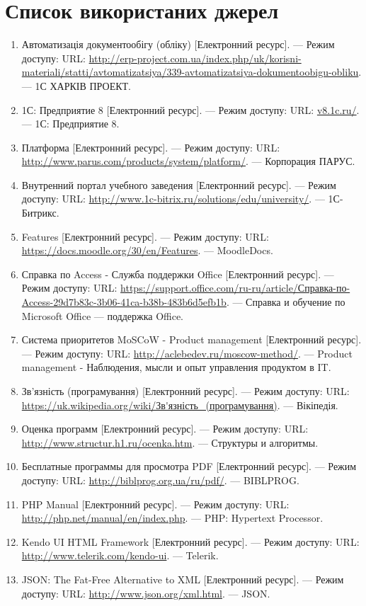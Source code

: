 \def\biblitem#1#2#3{\item \sloppypar#1 [Електронний ресурс]. --- Режим доступу: URL: \url{#2}. --- #3.}
\newpage
\section*{Список використаних джерел}
\bigskip
\begin{enumerate}
\biblitem{Автоматизація документообігу (обліку)}{http://erp-project.com.ua/index.php/uk/korisni-materiali/statti/avtomatizatsiya/339-avtomatizatsiya-dokumentoobigu-obliku}{1С ХАРКІВ ПРОЕКТ}
\biblitem{1С: Предприятие 8}{v8.1c.ru/}{1С: Предприятие 8}
\biblitem{Платформа}{http://www.parus.com/products/system/platform/}{Корпорация ПАРУС}
\biblitem{Внутренний портал учебного заведения}{http://www.1c-bitrix.ru/solutions/edu/university/}{1С-Битрикс}
\biblitem{Features}{https://docs.moodle.org/30/en/Features}{MoodleDocs}
\biblitem{Справка по Access - Служба поддержки Office}{https://support.office.com/ru-ru/article/Справка-по-Access-29d7b83c-3b06-41ca-b38b-483b6d5efb1b}{Справка и обучение по Microsoft Office --- поддержка Office}
\biblitem{Система приоритетов MoSCoW - Product management}{http://aclebedev.ru/moscow-method/}{Product management - Наблюдения, мысли и опыт управления продуктом в IT}
\biblitem{Зв'язність (програмування)}{https://uk.wikipedia.org/wiki/Зв'язність_(програмування)}{Вікіпедія}
\biblitem{Оценка программ}{http://www.structur.h1.ru/ocenka.htm}{Структуры и алгоритмы}
\biblitem{Бесплатные программы для просмотра PDF}{http://biblprog.org.ua/ru/pdf/}{BIBLPROG}
\biblitem{PHP Manual}{http://php.net/manual/en/index.php}{PHP: Hypertext Processor}
\biblitem{Kendo UI HTML Framework}{http://www.telerik.com/kendo-ui}{Telerik}
\biblitem{JSON: The Fat-Free Alternative to XML}{http://www.json.org/xml.html}{JSON}
\end{enumerate}
